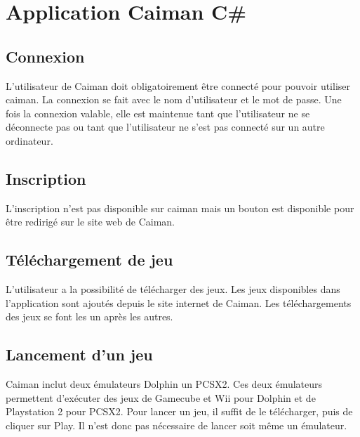 \documentclass[a4paper,12pt,french]{sphinxmanual}
\begin{document}
\section{Application  Caiman C\#}
\label{\detokenize{fonctionnelle:application-caiman-c}}

\subsection{Connexion}
\label{\detokenize{fonctionnelle:id2}}
\sphinxAtStartPar
L’utilisateur de Caiman doit obligatoirement être connecté pour pouvoir utiliser caiman. La connexion se fait avec le nom d’utilisateur et le mot de passe. Une fois la connexion valable, elle est maintenue tant que l’utilisateur ne se déconnecte pas ou tant que l’utilisateur ne s’est pas connecté sur un autre ordinateur.

\sphinxAtStartPar
{}


\subsection{Inscription}
\label{\detokenize{fonctionnelle:inscription}}
\sphinxAtStartPar
L’inscription n’est pas disponible sur caiman mais un bouton est disponible pour être redirigé sur le site web de Caiman.


\subsection{Téléchargement de jeu}
\label{\detokenize{fonctionnelle:telechargement-de-jeu}}
\sphinxAtStartPar
L’utilisateur a la possibilité de télécharger des jeux. Les jeux disponibles dans l’application sont ajoutés depuis le site internet de Caiman. Les téléchargements des jeux se font les un après les autres.

\sphinxAtStartPar
{}

\sphinxAtStartPar
{}


\subsection{Lancement d’un jeu}
\label{\detokenize{fonctionnelle:lancement-dun-jeu}}
\sphinxAtStartPar
Caiman inclut deux émulateurs Dolphin un PCSX2. Ces deux émulateurs permettent d’exécuter des jeux de Gamecube et Wii pour Dolphin et de Playstation 2 pour PCSX2. Pour lancer un jeu, il suffit de le télécharger, puis de cliquer sur Play. Il n’est donc pas nécessaire de lancer soit même un émulateur.
\end{document}
